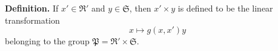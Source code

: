 \textbf{Definition.} If $x' \in \mathfrak{R}'$ and $y \in \mathfrak{S}$, then $x' \times y$ is defined to be the linear transformation
$$x \mapsto g(x, x')y$$
belonging to the group $\mathfrak{P} = \mathfrak{R}' \times \mathfrak{S}$.
